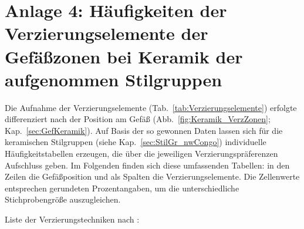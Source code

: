 \section*{Anlage 4: Häufigkeiten der Verzierungselemente der Gefäßzonen bei Keramik der aufgenommen Stilgruppen}\label{sec:StilGrVerzMatrizen}

Die Aufnahme der Verzierungselemente (Tab.~\ref{tab:Verzierungselemente}) erfolgte differenziert nach der Position am Gefäß (Abb.~\ref{fig:Keramik_VerzZonen}; Kap.~\ref{sec:GefKeramik}). Auf Basis der so gewonnen Daten lassen sich für die keramischen Stilgruppen (siehe Kap.~\ref{sec:StilGr_nwCongo}) individuelle Häufigkeitstabellen erzeugen, die über die jeweiligen Verzierungspräferenzen Aufschluss geben. Im Folgenden finden sich diese umfassenden Tabellen: in den Zeilen die Gefäßposition und als Spalten die Verzierungselemente. Die Zellenwerte entsprechen gerundeten Prozentangaben, um die unterschiedliche Stichprobengröße auszugleichen.

\vspace{1em}\noindent Liste der Verzierungstechniken nach \textcite[44 Tab.~3; siehe Tab.~\ref{tab:Verzierungselemente}, Abb.~\ref{fig:Keramik_VerzSystematik}]{Wotzka.1995}:
$\;$ \\

\vspace{.5em}

